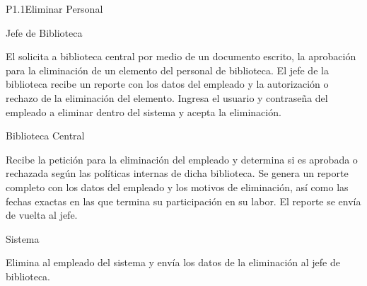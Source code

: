 \begin{Proceso}{P1.1}{Eliminar Personal}

    
     { %
    }

\end{Proceso}

\begin{PDescripcion}
    \Ppaso Jefe de Biblioteca
        \begin{enumerate}
            \Ppaso[\itarea] El  solicita a biblioteca central por medio de un documento escrito, la aprobación para la eliminación de un elemento del personal de biblioteca. 
            \Ppaso[\itarea] El jefe de la biblioteca recibe un reporte con los datos del empleado y la autorización o rechazo de la eliminación del elemento.
            \Ppaso[\itarea] Ingresa el usuario y contraseña del empleado a eliminar dentro del sistema y acepta la eliminación.
        \end{enumerate}
    
    \Ppaso Biblioteca Central
        \begin{enumerate}
            \Ppaso[\itarea] Recibe la petición para la eliminación del empleado y determina si es aprobada o rechazada según las políticas internas de dicha biblioteca.
            \Ppaso[\itarea] Se genera un reporte completo con los datos del empleado y los motivos de eliminación, así como las fechas exactas en las que termina su participación en su labor. El reporte se envía de vuelta al jefe.
        \end{enumerate}    
    
    \Ppaso Sistema
        \begin{enumerate}
            \Ppaso[\itarea] Elimina al empleado del sistema y envía los datos de la eliminación al jefe de biblioteca.  
        \end{enumerate} 
\end{PDescripcion}
